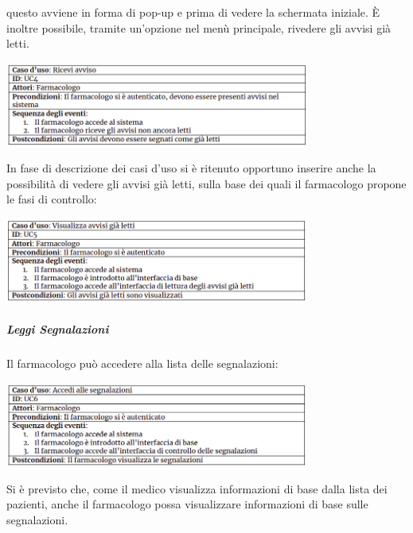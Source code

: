 \documentclass{article}
\begin{document}
questo avviene in forma di pop-up e prima di vedere la schermata iniziale. È inoltre possibile, tramite un'opzione nel menù principale, rivedere gli avvisi già letti.
\begin{center}
    \includegraphics[width=0.75\textwidth]{pictures/UC4.png}
\end{center}
In fase di descrizione dei casi d'uso si è ritenuto opportuno inserire anche la possibilità di vedere gli avvisi già letti, sulla base dei quali il farmacologo propone le fasi di controllo:
\begin{center}
    \includegraphics[width=0.75\textwidth]{pictures/UC5.png}
\end{center}
\subparagraph*{Leggi Segnalazioni}
Il farmacologo può accedere alla lista delle segnalazioni:
\begin{center}
    \includegraphics[width=0.75\textwidth]{pictures/UC6.png}
\end{center}
Si è previsto che, come il medico visualizza informazioni di base dalla lista dei pazienti, anche il farmacologo possa visualizzare informazioni di base sulle segnalazioni. 
\end{document}
